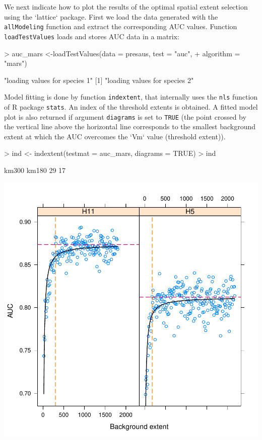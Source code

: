 \documentclass[10pt,a4paper]{article}
\begin{document}
We next indicate how to plot the results of the optimal spatial extent selection using the `lattice` package. First we load the data generated with the  \texttt{allModeling} function and extract the corresponding AUC values. Function  \texttt{loadTestValues} loads and stores AUC data in a matrix:

\begin{Schunk}
\begin{Sinput}
> auc_mars <-loadTestValues(data = presaus, test = "auc", 
+                           algorithm = "mars")
\end{Sinput}
\begin{Soutput}
[1] "loading values for species 1"
[1] "loading values for species 2"
\end{Soutput}
\end{Schunk}


Model fitting is done by function \texttt{indextent}, that internally uses the  \texttt{nls} function of R package  \texttt{stats}. An index of the threshold extents is obtained. A fitted model plot is also returned if argument  \texttt{diagrams} is set to  \texttt{TRUE} (the point crossed by the vertical line above the horizontal line corresponds to the smallest background extent at which the AUC overcomes the `Vm` value (threshold extent)).

\begin{Schunk}
\begin{Sinput}
> ind <- indextent(testmat = auc_mars, diagrams = TRUE)
> ind
\end{Sinput}
\begin{Soutput}
km300 km180 
   29    17 
\end{Soutput}
\end{Schunk}
\includegraphics{mopa-mopa14}
\end{document}
